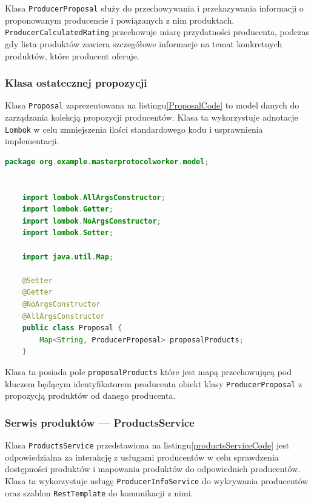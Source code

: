 Klasa \verb|ProducerProposal| służy do przechowywania i przekazywania informacji o proponowanym producencie i powiązanych z nim produktach. \verb|ProducerCalculatedRating| przechowuje miarę przydatności producenta, podczas gdy lista produktów zawiera szczegółowe informacje na temat konkretnych produktów, które producent oferuje.

\subsubsection{Klasa ostatecznej propozycji}

Klasa \verb|Proposal| zaprezentowana na listingu\ref{ProposalCode} to model danych do zarządzania kolekcją propozycji producentów. Klasa ta wykorzystuje adnotacje \verb|Lombok| w celu zmniejszenia ilości standardowego kodu i usprawnienia implementacji.

\begin{lstlisting}[language=Java, caption=Kod klasy Proposal,label=ProposalCode]
    package org.example.masterprotocolworker.model;
    
    
    import lombok.AllArgsConstructor;
    import lombok.Getter;
    import lombok.NoArgsConstructor;
    import lombok.Setter;
    
    import java.util.Map;
    
    @Setter
    @Getter
    @NoArgsConstructor
    @AllArgsConstructor
    public class Proposal {
        Map<String, ProducerProposal> proposalProducts;
    }
\end{lstlisting}

Klasa ta posiada pole \verb|proposalProducts| które jest mapą przechowującą pod kluczem będącym identyfikatorem producenta obiekt klasy \verb|ProducerProposal| z propozycją produktów od danego producenta.

\subsubsection{Serwis produktów --- ProductsService}

Klasa \verb|ProductsService| przedstawiona na listingu\ref{productsServiceCode} jest odpowiedzialna za interakcję z usługami producentów w celu sprawdzenia dostępności produktów i mapowania produktów do odpowiednich producentów. Klasa ta wykorzystuje usługę \verb|ProducerInfoService| do wykrywania producentów oraz szablon \verb|RestTemplate| do komunikacji z nimi. 

